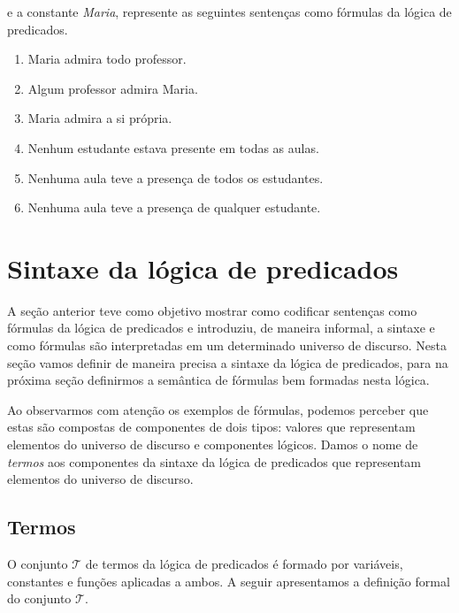 \begin{enumerate}
      e a constante \textit{Maria}, represente as seguintes sentenças
      como fórmulas da lógica de predicados.
      \begin{enumerate}
          \item Maria admira todo professor.
           \item Algum professor admira Maria.
           \item Maria admira a si própria.
           \item Nenhum estudante estava presente em todas as aulas.
           \item Nenhuma aula teve a presença de todos os estudantes.
           \item Nenhuma aula teve a presença de qualquer estudante.
      \end{enumerate}
\end{enumerate}

\section{Sintaxe da lógica de predicados}

A seção anterior teve como objetivo mostrar como codificar sentenças
como fórmulas da lógica de predicados e introduziu, de maneira
informal, a sintaxe e como fórmulas
são interpretadas em um determinado universo de
discurso. Nesta seção vamos definir de maneira precisa a sintaxe da
lógica de predicados, para na próxima seção definirmos a semântica de
fórmulas bem formadas nesta lógica.

Ao observarmos com atenção os exemplos de fórmulas, podemos perceber
que estas são compostas de componentes de dois tipos: valores que
representam elementos do universo de discurso e componentes
lógicos. Damos o nome de \textit{termos} aos componentes da sintaxe da
lógica de predicados que representam elementos do universo de
discurso.

\subsection{Termos}

O conjunto $\mathcal{T}$ de termos da lógica de predicados é formado
por variáveis, constantes e funções aplicadas a ambos. A seguir
apresentamos a definição formal do conjunto $\mathcal{T}$.

